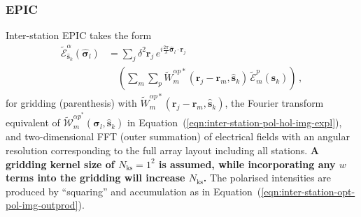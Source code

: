 \documentclass[
  journal=pasa,
  manuscript=article-type,
  year=2020,
  volume=37,
]{cup-journal}
\begin{document}
\subsubsection{EPIC}


Inter-station EPIC takes the form
\begin{align}
  \widetilde{\mathcal{E}}_{\hat{\boldsymbol{s}}_k}^\alpha(\hat{\boldsymbol{\sigma}}_l) &= \sum_j \delta^2 \boldsymbol{r}_j \, e^{i\frac{2\pi}{\lambda} \hat{\boldsymbol{\sigma}}_l\cdot\boldsymbol{r}_j} \nonumber\\
  &\quad \left(\sum_{m} \sum_p \widetilde{W}_{m}^{\alpha p*}(\boldsymbol{r}_j-\boldsymbol{r}_{m},\hat{\boldsymbol{s}}_k) \, \widetilde{\mathcal{E}}_m^p(\hat{\boldsymbol{s}}_k) \right) \, , \label{eqn:inter-station-pol-hol-img-epic-expl}
\end{align}
for gridding (parenthesis) with $\widetilde{W}_{m}^{\alpha p*}(\boldsymbol{r}_j-\boldsymbol{r}_{m},\hat{\boldsymbol{s}}_k)$, the Fourier transform equivalent of $\widetilde{\mathcal{W}}_{m}^{{\alpha p}^*}(\boldsymbol{\sigma}_l,\hat{\boldsymbol{s}}_k)$ in Equation~(\ref{eqn:inter-station-pol-hol-img-expl}), and two-dimensional FFT (outer summation) of electrical fields with an angular resolution corresponding to the full array layout including all stations. \textbf{A gridding kernel size of $N_\textrm{ks}=1^2$ is assumed, while incorporating any $w$ terms into the gridding will increase $N_\textrm{ks}$.} The polarised intensities are produced by ``squaring'' and accumulation as in Equation~(\ref{eqn:inter-station-opt-pol-img-outprod}).
\end{document}
